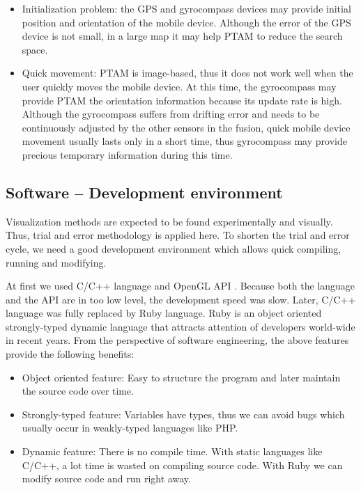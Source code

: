 \begin{itemize}
	\item Initialization problem: the GPS and gyrocompass devices may provide initial position and orientation of the mobile device. Although the error of the GPS device is not small, in a large map it may help PTAM to reduce the search space.
	\item Quick movement: PTAM is image-based, thus it does not work well when the user quickly moves the mobile device. At this time, the gyrocompass may provide PTAM the orientation information because its update rate is high. Although the gyrocompass suffers from drifting error and needs to be continuously adjusted by the other sensors in the fusion, quick mobile device movement usually lasts only in a short time, thus gyrocompass may provide precious temporary information during this time.
\end{itemize}

\subsection{Software -- Development environment}

Visualization methods are expected to be found experimentally and visually. Thus, trial and error methodology is applied here. To shorten the trial and error cycle, we need a good development environment which allows quick compiling, running and modifying.

At first we used C/C++ language and OpenGL API \citep{Reference10}. Because both the language and the API are in too low level, the development speed was slow. Later, C/C++ language was fully replaced by Ruby language. Ruby is an object oriented strongly-typed dynamic language that attracts attention of developers world-wide in recent years. From the perspective of software engineering, the above features provide the following benefits:

\begin{itemize}
	\item Object oriented feature: Easy to structure the program and later maintain the source code over time.
	\item Strongly-typed feature: Variables have types, thus we can avoid bugs which usually occur in weakly-typed languages like PHP.
	\item Dynamic feature: There is no compile time. With static languages like C/C++, a lot time is wasted on compiling source code. With Ruby we can modify source code and run right away.
\end{itemize}

